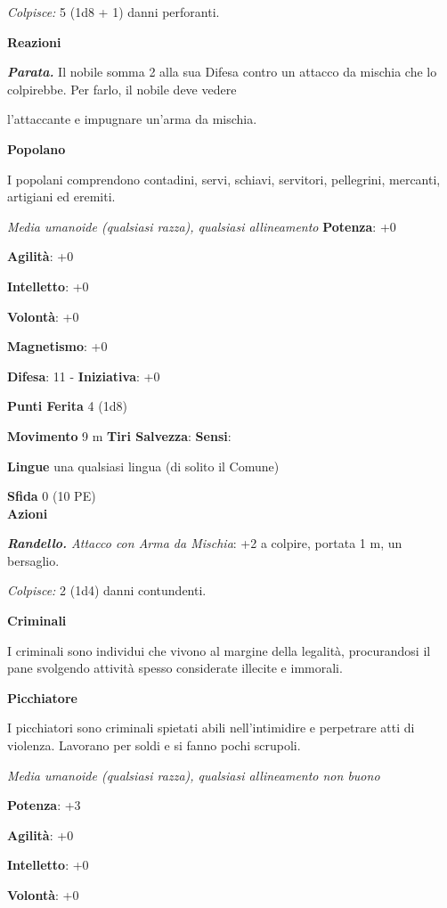 \begin{multicols}{2}
\emph{Colpisce:} 5 (1d8 + 1) danni perforanti.

\textbf{Reazioni}

\emph{\textbf{Parata.}} Il nobile somma 2 alla sua Difesa contro un attacco
da mischia che lo colpirebbe. Per farlo, il nobile deve vedere

l'attaccante e impugnare un'arma da mischia.

\textbf{Popolano}

I popolani comprendono contadini, servi, schiavi, servitori, pellegrini,
mercanti, artigiani ed eremiti.

\emph{Media umanoide (qualsiasi razza), qualsiasi allineamento}
\textbf{Potenza}: +0

\textbf{Agilità}: +0

\textbf{Intelletto}: +0

\textbf{Volontà}: +0

\textbf{Magnetismo}: +0

\textbf{Difesa}: 11 - \textbf{Iniziativa}: +0

\textbf{Punti Ferita} 4 (1d8)

\textbf{Movimento} 9 m
\textbf{Tiri Salvezza}:
\textbf{Sensi}: 

\textbf{Lingue} una qualsiasi lingua (di solito il Comune)

\textbf{Sfida} 0 (10 PE)\smallskip\\

\smallskip\textbf{Azioni}

\emph{\textbf{Randello.} Attacco con Arma da Mischia}: +2 a colpire,
portata 1 m, un bersaglio.

\emph{Colpisce:} 2 (1d4) danni contundenti.

\textbf{Criminali}

I criminali sono individui che vivono al margine della legalità,
procurandosi il pane svolgendo attività spesso considerate illecite e
immorali.

\textbf{Picchiatore}

I picchiatori sono criminali spietati abili nell'intimidire e perpetrare
atti di violenza. Lavorano per soldi e si fanno pochi scrupoli.

\emph{Media umanoide (qualsiasi razza), qualsiasi allineamento non
buono}

\textbf{Potenza}: +3

\textbf{Agilità}: +0

\textbf{Intelletto}: +0

\textbf{Volontà}: +0


\end{multicols}
